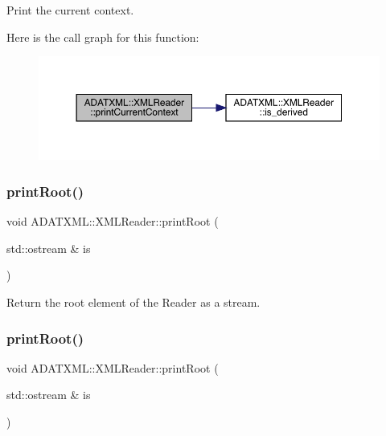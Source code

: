 Print the current context. 

Here is the call graph for this function\+:
\nopagebreak
\begin{figure}[H]
\begin{center}
\leavevmode
\includegraphics[width=350pt]{db/d3f/classADATXML_1_1XMLReader_a424f9e30746b4fdc106b57b5ce95f7ec_cgraph}
\end{center}
\end{figure}
\mbox{\label{classADATXML_1_1XMLReader_a732a08c1605f8c01663105bb3586b575}} 
\subsubsection{\texorpdfstring{printRoot()}{printRoot()}\hspace{0.1cm}{\footnotesize\ttfamily [1/2]}}
{\footnotesize\ttfamily void A\+D\+A\+T\+X\+M\+L\+::\+X\+M\+L\+Reader\+::print\+Root (\begin{DoxyParamCaption}\item[{std\+::ostream \&}]{is }\end{DoxyParamCaption})}



Return the root element of the Reader as a stream. 

\mbox{\label{classADATXML_1_1XMLReader_a732a08c1605f8c01663105bb3586b575}} 
\subsubsection{\texorpdfstring{printRoot()}{printRoot()}\hspace{0.1cm}{\footnotesize\ttfamily [2/2]}}
{\footnotesize\ttfamily void A\+D\+A\+T\+X\+M\+L\+::\+X\+M\+L\+Reader\+::print\+Root (\begin{DoxyParamCaption}\item[{std\+::ostream \&}]{is }\end{DoxyParamCaption})}



